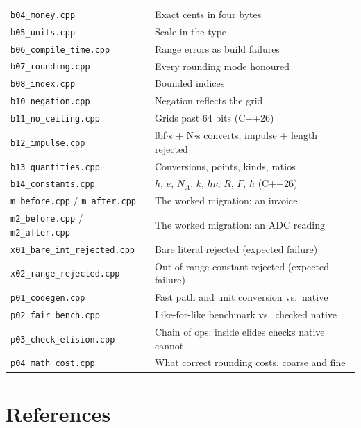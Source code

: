 \documentclass[11pt,a4paper]{article}
\newcommand{\file}[1]{\texttt{\small #1}}
\begin{document}
\begin{center}
\begin{tabular}{@{}l l@{}}
\file{b04\_money.cpp}             & Exact cents in four bytes \\
\file{b05\_units.cpp}             & Scale in the type \\
\file{b06\_compile\_time.cpp}     & Range errors as build failures \\
\file{b07\_rounding.cpp}          & Every rounding mode honoured \\
\file{b08\_index.cpp}             & Bounded indices \\
\file{b10\_negation.cpp}          & Negation reflects the grid \\
\file{b11\_no\_ceiling.cpp}       & Grids past 64 bits (C++26) \\
\file{b12\_impulse.cpp}           & lbf$\cdot$s + N$\cdot$s converts; impulse + length rejected \\
\file{b13\_quantities.cpp}        & Conversions, points, kinds, ratios \\
\file{b14\_constants.cpp}         & $h$, $e$, $N_A$, $k$, $h\nu$, $R$, $F$, $\hbar$ (C++26) \\
\midrule
\file{m\_before.cpp} / \file{m\_after.cpp} & The worked migration: an invoice \\
\file{m2\_before.cpp} / \file{m2\_after.cpp} & The worked migration: an ADC reading \\
\file{x01\_bare\_int\_rejected.cpp} & Bare literal rejected (expected failure) \\
\file{x02\_range\_rejected.cpp}     & Out-of-range constant rejected (expected failure) \\
\file{p01\_codegen.cpp}             & Fast path and unit conversion vs.\ native \\
\file{p02\_fair\_bench.cpp}         & Like-for-like benchmark vs.\ checked native \\
\file{p03\_check\_elision.cpp}      & Chain of ops: inside elides checks native cannot \\
\file{p04\_math\_cost.cpp}          & What correct rounding costs, coarse and fine \\
\bottomrule
\end{tabular}
\end{center}

\section{References}
\end{document}
